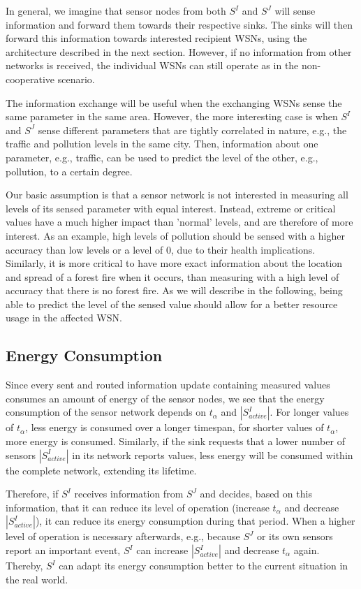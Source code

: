 \documentclass[onecolumn]{jaise2e}
\begin{document}
In general, we imagine that sensor nodes from both $S^I$ and $S^J$ will sense information and forward them towards their respective sinks. The sinks will then forward this information towards interested recipient WSNs, using the architecture described in the next section. However, if no information from other networks is received, the individual WSNs can still operate as in the non-cooperative scenario.

The information exchange will be useful when the exchanging WSNs sense the same parameter in the same area. However, the more interesting case is when $S^I$ and $S^J$ sense different parameters that are tightly correlated in nature, e.g., the traffic and pollution levels in the same city. Then, information about one parameter, e.g., traffic, can be used to predict the level of the other, e.g., pollution, to a certain degree.
 
Our basic assumption is that a sensor network is not interested in measuring all levels of its sensed parameter with equal interest. Instead, extreme or critical values have a much higher impact than 'normal' levels, and are therefore of more interest. As an example, high levels of pollution should be sensed with a higher accuracy than low levels or a level of 0, due to their health implications. Similarly, it is more critical to have more exact information about the location and spread of a forest fire when it occurs, than measuring with a high level of accuracy that there is no forest fire. As we will describe in the following, being able to predict the level of the sensed value should allow for a better resource usage in the affected WSN.

\subsection{Energy Consumption}

Since every sent and routed information update containing measured values consumes an amount of energy of the sensor nodes, we see that the energy consumption of the sensor network depends on $t_\alpha$ and $|S^{I}_{active}|$. For longer values of $t_\alpha$, less energy is consumed over a longer timespan, for shorter values of $t_\alpha$, more energy is consumed. Similarly, if the sink requests that a lower number of sensors $|S^{I}_{active}|$ in its network reports values, less energy will be consumed within the complete network, extending its lifetime.

Therefore, if $S^I$ receives information from $S^J$ and decides, based on this information, that it can reduce its level of operation (increase $t_\alpha$ and decrease $|S^{I}_{active}|$), it can reduce its energy consumption during that period. When a higher level of operation is necessary afterwards, e.g., because $S^J$ or its own sensors report an important event, $S^I$ can increase $|S^{I}_{active}|$ and decrease $t_\alpha$ again. Thereby, $S^I$ can adapt its energy consumption better to the current situation in the real world.
\end{document}
